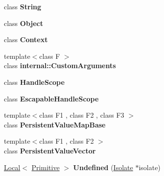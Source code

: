 \begin{DoxyCompactItemize}
\item 
\hypertarget{classv8_1_1Local_a7fb804f7dc96dd9f705c84095f37f1ca}{}class {\bfseries String}\label{classv8_1_1Local_a7fb804f7dc96dd9f705c84095f37f1ca}

\item 
\hypertarget{classv8_1_1Local_a0720b5f434e636e22a3ed34f847eec57}{}class {\bfseries Object}\label{classv8_1_1Local_a0720b5f434e636e22a3ed34f847eec57}

\item 
\hypertarget{classv8_1_1Local_ac26c806e60ca4a0547680edb68f6e39b}{}class {\bfseries Context}\label{classv8_1_1Local_ac26c806e60ca4a0547680edb68f6e39b}

\item 
\hypertarget{classv8_1_1Local_a07108678a2af25caab612879ed7dca62}{}{\footnotesize template$<$class F $>$ }\\class {\bfseries internal\+::\+Custom\+Arguments}\label{classv8_1_1Local_a07108678a2af25caab612879ed7dca62}

\item 
\hypertarget{classv8_1_1Local_a5f127e488db492b05c8542cec0b880b7}{}class {\bfseries Handle\+Scope}\label{classv8_1_1Local_a5f127e488db492b05c8542cec0b880b7}

\item 
\hypertarget{classv8_1_1Local_ade20a528f8ee42d426959f061cff29ff}{}class {\bfseries Escapable\+Handle\+Scope}\label{classv8_1_1Local_ade20a528f8ee42d426959f061cff29ff}

\item 
\hypertarget{classv8_1_1Local_a08e2b8f164392d71811ce6cc134f33e3}{}{\footnotesize template$<$class F1 , class F2 , class F3 $>$ }\\class {\bfseries Persistent\+Value\+Map\+Base}\label{classv8_1_1Local_a08e2b8f164392d71811ce6cc134f33e3}

\item 
\hypertarget{classv8_1_1Local_a978bb1377559897d74d5fe883a54a315}{}{\footnotesize template$<$class F1 , class F2 $>$ }\\class {\bfseries Persistent\+Value\+Vector}\label{classv8_1_1Local_a978bb1377559897d74d5fe883a54a315}

\item 
\hypertarget{classv8_1_1Local_a696a04c5f02bf0aeedd1e5a539587de4}{}\hyperlink{classv8_1_1Local}{Local}$<$ \hyperlink{classv8_1_1Primitive}{Primitive} $>$ {\bfseries Undefined} (\hyperlink{classv8_1_1Isolate}{Isolate} $\ast$isolate)\label{classv8_1_1Local_a696a04c5f02bf0aeedd1e5a539587de4}


\end{DoxyCompactItemize}
